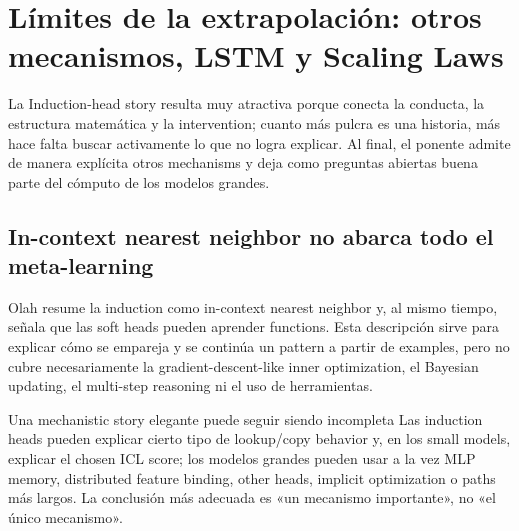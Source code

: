 \section{Límites de la extrapolación: otros mecanismos, LSTM y Scaling Laws}

La Induction-head story resulta muy atractiva porque conecta la conducta, la estructura matemática y la intervention; cuanto más pulcra es una historia, más hace falta buscar activamente lo que no logra explicar. Al final, el ponente admite de manera explícita otros mechanisms y deja como preguntas abiertas buena parte del cómputo de los modelos grandes.

\subsection{In-context nearest neighbor no abarca todo el meta-learning}

Olah resume la induction como in-context nearest neighbor y, al mismo tiempo, señala que las soft heads pueden aprender functions. Esta descripción sirve para explicar cómo se empareja y se continúa un pattern a partir de examples, pero no cubre necesariamente la gradient-descent-like inner optimization, el Bayesian updating, el multi-step reasoning ni el uso de herramientas.



\begin{warningbox}{Una mechanistic story elegante puede seguir siendo incompleta}
Las induction heads pueden explicar cierto tipo de lookup/copy behavior y, en los small models, explicar el chosen ICL score; los modelos grandes pueden usar a la vez MLP memory, distributed feature binding, other heads, implicit optimization o paths más largos. La conclusión más adecuada es «un mecanismo importante», no «el único mecanismo».
\end{warningbox}


